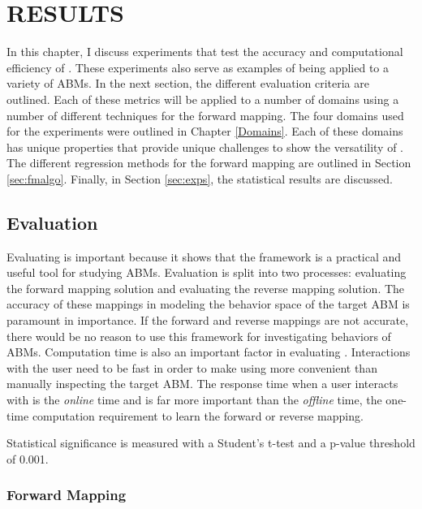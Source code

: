 \chapter{RESULTS}
\thispagestyle{plain}

\label{Results}

In this chapter, I discuss experiments that test the  accuracy and computational efficiency of \fw.
These experiments also serve as examples of \fw being applied to a variety of ABMs.
In the next section, the different evaluation criteria are outlined.
Each of these metrics will be applied to a number of domains using a number of different techniques for the forward mapping.
The four domains used for the experiments were outlined in Chapter \ref{Domains}.
Each of these domains has unique properties that provide unique challenges to show the versatility of \fw.
The different regression methods for the forward mapping are outlined in Section \ref{sec:fmalgo}.
Finally, in Section \ref{sec:exps}, the statistical results are discussed.

\section{Evaluation}

Evaluating \fw is important because it shows that the framework is a practical and useful tool for studying ABMs.
Evaluation is split into two processes: evaluating the forward mapping solution and evaluating the reverse mapping solution.
The accuracy of these mappings in modeling the behavior space of the target ABM is paramount in importance.
If the forward and reverse mappings are not accurate, there would be no reason to use this framework for investigating behaviors of ABMs.
Computation time is also an important factor in evaluating \fw.
Interactions with the user need to be fast in order to make using \fw more convenient than manually inspecting the target ABM.
The response time when a user interacts with \fw is the \textit{online} time and is far more important than the \textit{offline} time, the one-time computation requirement to learn the forward or reverse mapping.

Statistical significance is measured with a Student's t-test and a p-value threshold of 0.001.


 \subsection{Forward Mapping}

